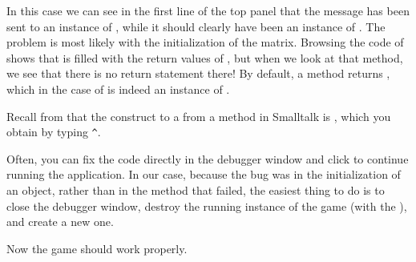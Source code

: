 \documentclass[a4paper,10pt,twoside]{book}
\begin{document}
In this case we can see in the first line of the top panel that the  message has been sent to an instance of , while it should clearly have been an instance of .
The problem is most likely with the initialization of the  matrix.
Browsing the code of  shows that  is filled with the return values of , but when we look at that method, we see that there is no return statement there!
By default, a method returns , which in the case of  is indeed an instance of .

\dothis{Close the debugger window.
Add the expression ``\ct{^ c}'' to the end of the method \ct{SBEGame>>>newCellAt:at:} so that it returns \ct{c}.
(See \mthref{newCellAt:at:nobug}.)}


\noindent
Recall from  that the construct to  a  from a method in Smalltalk is \ct{^}, which you obtain by typing \verb|^|.

Often, you can fix the code directly in the debugger window and click  to continue running the application.
In our case, because the bug was in the initialization of an object, rather than in the method that failed, the easiest thing to do is to close the debugger window, destroy the running instance of the game (with the ), and create a new one.


Now the game should work properly.

\end{document}
